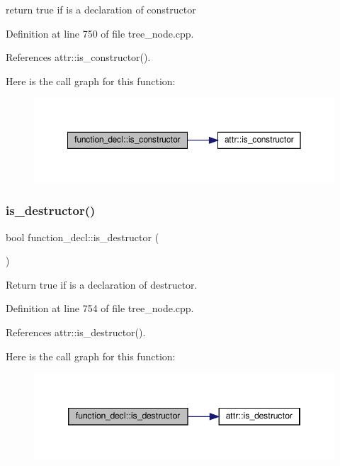 return true if is a declaration of constructor 



Definition at line 750 of file tree\+\_\+node.\+cpp.



References attr\+::is\+\_\+constructor().

Here is the call graph for this function\+:
\nopagebreak
\begin{figure}[H]
\begin{center}
\leavevmode
\includegraphics[width=350pt]{d0/d43/structfunction__decl_a69081428217c87b99516ceb4d1d32187_cgraph}
\end{center}
\end{figure}
\mbox{\label{structfunction__decl_a605cf5474b9950c3d8359325492c4c96}} 
\subsubsection{\texorpdfstring{is\+\_\+destructor()}{is\_destructor()}}
{\footnotesize\ttfamily bool function\+\_\+decl\+::is\+\_\+destructor (\begin{DoxyParamCaption}{ }\end{DoxyParamCaption})}



Return true if is a declaration of destructor. 



Definition at line 754 of file tree\+\_\+node.\+cpp.



References attr\+::is\+\_\+destructor().

Here is the call graph for this function\+:
\nopagebreak
\begin{figure}[H]
\begin{center}
\leavevmode
\includegraphics[width=346pt]{d0/d43/structfunction__decl_a605cf5474b9950c3d8359325492c4c96_cgraph}
\end{center}
\end{figure}
\mbox{\label{structfunction__decl_a17b04dabdeed7443468c578ff0c8812d}} 
